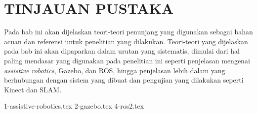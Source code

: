 \chapter{TINJAUAN PUSTAKA}
\label{chap:tinjauanpustaka}

Pada bab ini akan dijelaskan teori-teori penunjang yang digunakan sebagai bahan acuan dan referensi untuk penelitian yang dilakukan.
Teori-teori yang dijelaskan pada bab ini akan dipaparkan dalam urutan yang sistematis,
  dimulai dari hal paling mendasar yang digunakan pada penelitian ini seperti penjelasan mengenai \emph{assistive robotics}, Gazebo, dan ROS,
  hingga penjelasan lebih dalam yang berhubungan dengan sistem yang dibuat dan pengujian yang dilakukan seperti Kinect dan SLAM.

{1-assistive-robotics.tex}
{2-gazebo.tex}
{4-ros2.tex}
